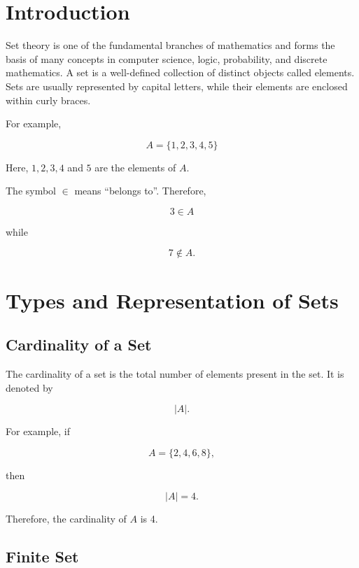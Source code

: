 \documentclass[12pt,a4paper]{article}
\begin{document}
\section{Introduction}

Set theory is one of the fundamental branches of mathematics and forms the basis
of many concepts in computer science, logic, probability, and discrete mathematics.
A set is a well-defined collection of distinct objects called elements. Sets are
usually represented by capital letters, while their elements are enclosed within
curly braces.

For example,

\[
A=\{1,2,3,4,5\}
\]

Here, $1,2,3,4$ and $5$ are the elements of $A$.

The symbol $\in$ means ``belongs to''. Therefore,

\[
3\in A
\]

while

\[
7\notin A.
\]


\section{Types and Representation of Sets}


\subsection{Cardinality of a Set}

The cardinality of a set is the total number of elements present in the set.
It is denoted by

\[
|A|.
\]

For example, if

\[
A=\{2,4,6,8\},
\]

then

\[
|A|=4.
\]

Therefore, the cardinality of $A$ is 4.


\subsection{Finite Set}
\end{document}
